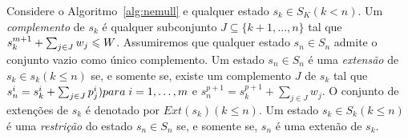 
\begin{mydef}
Considere o Algoritmo~\ref{alg:nemull} e qualquer estado $s_k \in S_K (k < n)$.
Um \emph{complemento} de $s_k$ é qualquer subconjunto  $J \subseteq \{k+1, \ldots, n\}$
tal que $s_k^{m+1} + \sum_{j \in J} w_j \leqslant W$.
Assumiremos que qualquer estado $s_n \in S_n$ admite o conjunto vazio como único complemento.
Um estado $s_n \in S_n$ é uma \emph{extensão} de $s_k \in s_k (k \leq n )$ se, e somente se,
existe um complemento $J$ de $s_k$ tal que $s_n^i = s_k^i + \sum_{j \in J} p_j^i) para \; i = 1, \ldots, m$
e $s_n^{p+1} = s_k^{p+1} + \sum_{j \in J} w_j$.
O conjunto de extenções de $s_k$ é denotado por $Ext(s_k) (k \leq n)$.
Um estado $s_k \in S_k (k \leq n)$ é uma \emph{restrição} do estado $s_n \in S_n$
se, e somente se, $s_n$ é uma extenão de $s_k$.
\end{mydef}

\begin{mydef}
\end{mydef}

\subsection{}
